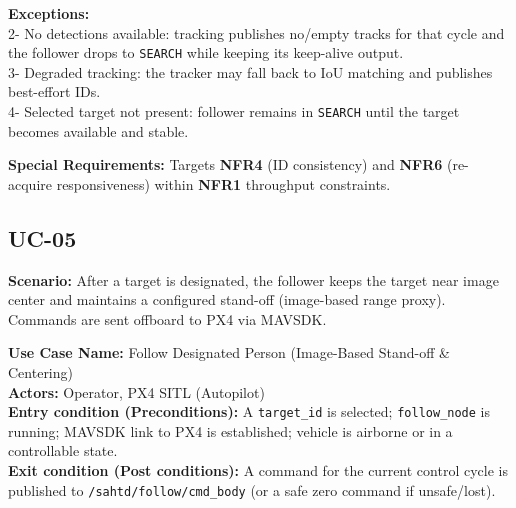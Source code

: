 \documentclass[12pt,a4paper]{report}
\begin{document}
\vspace{0.5em}
\noindent\textbf{Exceptions:}\\
2- No detections available: tracking publishes no/empty tracks for that cycle and the follower drops to \texttt{SEARCH} while keeping its keep-alive output.\\
3- Degraded tracking: the tracker may fall back to \ac{IoU} matching and publishes best-effort IDs.\\
4- Selected target not present: follower remains in \texttt{SEARCH} until the target becomes available and stable.

\noindent\textbf{Special Requirements:} Targets \textbf{NFR4} (ID consistency) and \textbf{NFR6} (re-acquire responsiveness) within \textbf{NFR1} throughput constraints.

\subsection*{UC-05}

\vspace{0.5em}
\noindent\textbf{Scenario:} After a target is designated, the follower keeps the target near image center and maintains a configured stand-off (image-based range proxy). Commands are sent offboard to PX4 via MAVSDK.

\noindent\textbf{Use Case Name:} Follow Designated Person (Image-Based Stand-off \& Centering)\\
\textbf{Actors:} Operator, PX4 SITL (Autopilot)\\
\textbf{Entry condition (Preconditions):} A \texttt{target\_id} is selected; \texttt{follow\_node} is running; MAVSDK link to PX4 is established; vehicle is airborne or in a controllable state.\\
\textbf{Exit condition (Post conditions):} A command for the current control cycle is published to \texttt{/sahtd/follow/cmd\_body} (or a safe zero command if unsafe/lost).
\end{document}
